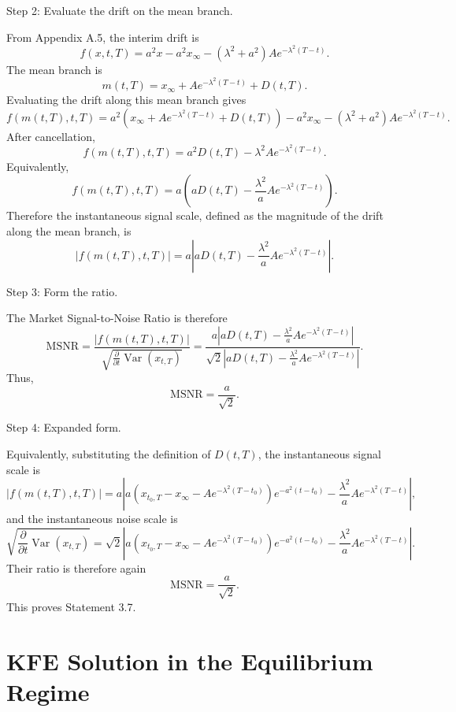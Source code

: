 \documentclass[12pt]{article}
\theoremstyle{statementstyle}
\begin{document}
\begin{appendices}
Step 2: Evaluate the drift on the mean branch.

From Appendix A.5, the interim drift is
\[
f(x,t,T)
=
a^2x
-
a^2x_\infty
-
(\lambda^2+a^2)Ae^{-\lambda^2(T-t)}.
\]
The mean branch is
\[
m(t,T)
=
x_\infty
+
Ae^{-\lambda^2(T-t)}
+
D(t,T).
\]
Evaluating the drift along this mean branch gives
\[
f(m(t,T),t,T)
=
a^2\left(
x_\infty
+
Ae^{-\lambda^2(T-t)}
+
D(t,T)
\right)
-
a^2x_\infty
-
(\lambda^2+a^2)Ae^{-\lambda^2(T-t)}.
\]
After cancellation,
\[
f(m(t,T),t,T)
=
a^2D(t,T)
-
\lambda^2Ae^{-\lambda^2(T-t)}.
\]
Equivalently,
\[
f(m(t,T),t,T)
=
a\left(
aD(t,T)
-
\frac{\lambda^2}{a}Ae^{-\lambda^2(T-t)}
\right).
\]
Therefore the instantaneous signal scale, defined as the magnitude of the drift along the
mean branch, is
\[
|f(m(t,T),t,T)|
=
a
\left|
aD(t,T)
-
\frac{\lambda^2}{a}Ae^{-\lambda^2(T-t)}
\right|.
\]

Step 3: Form the ratio.

The Market Signal-to-Noise Ratio is therefore
\[
\mathrm{MSNR}
=
\frac{|f(m(t,T),t,T)|}
{\sqrt{\frac{\partial}{\partial t}\operatorname{Var}(x_{t,T})}}
=
\frac{
a
\left|
aD(t,T)
-
\frac{\lambda^2}{a}Ae^{-\lambda^2(T-t)}
\right|
}{
\sqrt{2}
\left|
aD(t,T)
-
\frac{\lambda^2}{a}Ae^{-\lambda^2(T-t)}
\right|
}.
\]
Thus,
\[
\boxed{
\mathrm{MSNR}
=
\frac{a}{\sqrt{2}}.
}
\]

Step 4: Expanded form.

Equivalently, substituting the definition of \(D(t,T)\), the instantaneous signal scale is
\[
|f(m(t,T),t,T)|
=
a\left|
a\left(
x_{t_0,T}
-
x_\infty
-
Ae^{-\lambda^2(T-t_0)}
\right)
e^{-a^2(t-t_0)}
-
\frac{\lambda^2}{a}Ae^{-\lambda^2(T-t)}
\right|,
\]
and the instantaneous noise scale is
\[
\sqrt{
\frac{\partial}{\partial t}\operatorname{Var}(x_{t,T})
}
=
\sqrt{2}
\left|
a\left(
x_{t_0,T}
-
x_\infty
-
Ae^{-\lambda^2(T-t_0)}
\right)
e^{-a^2(t-t_0)}
-
\frac{\lambda^2}{a}Ae^{-\lambda^2(T-t)}
\right|.
\]
Their ratio is therefore again
\[
\boxed{
\mathrm{MSNR}=\frac{a}{\sqrt{2}}.
}
\]
This proves Statement 3.7.




\section{KFE Solution in the Equilibrium Regime}
\label{appendix:B}


\end{appendices}
\end{document}
